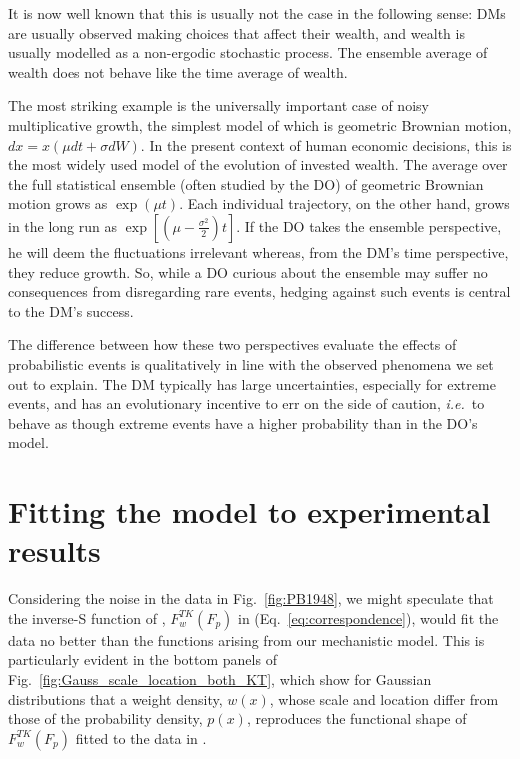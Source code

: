\documentclass[12pt,letter,timesnewroman]{article}
\newcommand{\eref}[1]{(Eq.~\ref{eq:#1})}
\newcommand{\fref}[1]{Fig.~\ref{fig:#1}}
\newcommand{\seclabel}[1]{\label{sec:#1}}
\newcommand{\ie}{\textit{i.e.}\ }
\begin{document}
It is now well known that this is usually not the case in the following sense: DMs are usually observed making choices that affect their wealth, and wealth is usually modelled as a non-ergodic stochastic process. The ensemble average of wealth does not behave like the time average of wealth.

The most striking example is the universally important case of noisy multiplicative growth, the simplest model of which is geometric Brownian motion, $dx=x(\mu dt+\sigma dW)$. In the present context of human economic decisions, this is the most widely used model of the evolution of invested wealth. The average over the full statistical ensemble (often studied by the DO) of geometric Brownian motion grows as $\exp(\mu t)$. Each individual trajectory, on the other hand, grows in the long run as $\exp[(\mu-\frac{\sigma^2}{2})t]$. If the DO takes the ensemble perspective, he will deem the fluctuations irrelevant whereas, from the DM's time perspective, they reduce growth. So, while a DO curious about the ensemble may suffer no consequences from disregarding rare events, hedging against such events is central to the DM's success.

The difference between how these two perspectives evaluate the effects of probabilistic events is qualitatively in line with the observed phenomena we set out to explain. The DM typically has large uncertainties, especially for extreme events, and has an evolutionary incentive to err on the side of caution, \ie to behave as though extreme events have a higher probability than in the DO's model.

\section{Fitting the model to experimental results \seclabel{Fitting_the}}
Considering the noise in the data in \fref{PB1948}, we might speculate that the inverse-S function of \textcite{TverskyKahneman1992}, $F^{TK}_w(F_p)$ in \eref{correspondence}, would fit the data no better than the functions arising from our mechanistic model. This is particularly evident in the bottom panels of \fref{Gauss_scale_location_both_KT}, which show for Gaussian distributions that a weight density, $w(x)$, whose scale and location differ from those of the probability density, $p(x)$, reproduces the functional shape of $F^{TK}_w(F_p)$ fitted to the data in \textcite{PrestonBaratta1948}.
\end{document}
